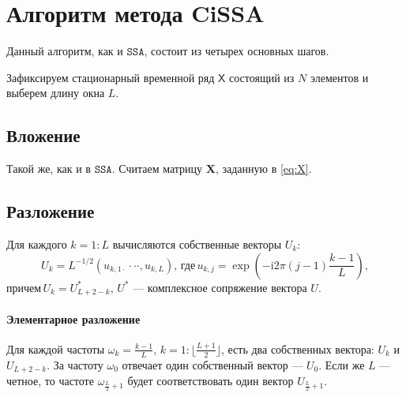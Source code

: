 \documentclass[12pt, specialist, subf
]{disser}
\theoremstyle{definition}
\newcommand{\SSA}{\texttt{SSA}}
\newcommand{\TS}{\mathsf{X}}
\newtheorem{definition}{Определение} %
\begin{document}

\section{Алгоритм метода CiSSA}


Данный алгоритм, как и $\SSA$, состоит из четырех основных шагов.

Зафиксируем стационарный временной ряд $\TS$ состоящий из $N$ элементов и выберем длину окна $L$.
\subsection*{Вложение}
Такой же, как и в $\SSA$. Считаем матрицу $\mathbf{X}$, заданную в \eqref{eq:X}.

\subsection*{Разложение}

Для каждого $k = 1:L$ вычисляются собственные векторы ${U}_{k}$:
\begin{equation}
	\label{eq:U_k}
	{U}_{k}=L^{-1/2}(u_{k,1\cdot}\cdot\cdot\cdot,u_{k,L}), \, \text{где} \,
	u_{k,j}=\exp\left(-\mathrm{i}2\pi(j-1)\frac{k-1}{L}\right),
\end{equation}
$\text{причем} \, U_{k} = U_{L+2-k}^*$,  $U^*$ --- комплексное сопряжение вектора $U$.


\paragraph{Элементарное разложение \newline}

Для каждой частоты $\omega_k = \frac{k-1}{L}$, $k = 1:\lfloor \frac{L+1}{2} \rfloor$, есть два собственных вектора: $U_k$ и $U_{L+2-k}$. За частоту $\omega_0$ отвечает один собственный вектор --- $U_0$. Если же $L$ --- четное, то частоте $\omega_{\frac{L}{2} + 1}$ будет соответствовать один вектор $U_{\frac{L}{2}+1}$.
\end{document}
